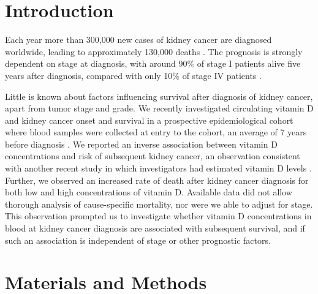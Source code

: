 \documentclass[a4paper,11pt]{article}
\renewcommand{\cite}{\citep}
\begin{document}
\section*{Introduction}
Each year more than 300,000 new cases of kidney cancer are diagnosed worldwide, 
leading to approximately 130,000 deaths \cite{ferlay_cancer_2013}. The prognosis 
is strongly dependent on stage at diagnosis, with around 90\% of stage I 
patients alive five years after diagnosis, compared with only 10\% of stage IV 
patients \cite{CRUK_kidney_2014}.

Little is known about factors influencing survival after diagnosis of kidney 
cancer, apart from tumor stage and grade. We recently investigated circulating 
vitamin D and kidney cancer onset and survival in a prospective epidemiological 
cohort where blood samples were collected at entry to the cohort, an average 
of 7 years before diagnosis \cite{muller_circulating_2014}. We reported an 
inverse association between vitamin D concentrations and risk of subsequent 
kidney cancer, an observation consistent with another recent study in which 
investigators had estimated vitamin D levels \cite{joh_predicted_2013}. 
Further, we observed an increased rate of death after kidney cancer diagnosis 
for both low and high concentrations of vitamin D. Available data did not allow 
thorough analysis of cause-specific mortality, nor were we able to adjust for 
stage. This observation prompted us to investigate whether vitamin D 
concentrations in blood at kidney cancer diagnosis are associated with 
subsequent survival, and if such an association is independent of stage or 
other prognostic factors.   

\section*{Materials and Methods}
\end{document}
